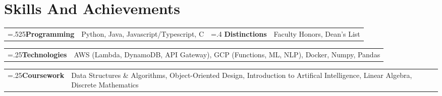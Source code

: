 \documentclass[10pt]{article}
\newcommand{\onelinecontent}[2]
    {
        \small\textbf{#1} & #2
    }
\begin{document}
                                                \section{Skills And Achievements}
                    \begin{flushleft}
                                                            \begin{tabularx}{\linewidth}{
                        >{\hsize=.525\hsize}X%
                        >{\hsize=1.475\hsize}X%
                        >{\hsize=.4\hsize}X%
                        >{\hsize=1.6\hsize}X%
                        }
                        \onelinecontent{Programming}{Python, Java, Javascript/Typescript, C}  &   \onelinecontent{Distinctions}{Faculty Honors, Dean's List} \\
                        \end{tabularx}
                                                                                \begin{tabularx}{\linewidth}{
                            >{\hsize=.25\hsize}X%
                            >{\hsize=1.75\hsize}X%
                            }
                            \onelinecontent{Technologies}{AWS (Lambda, DynamoDB, API Gateway), GCP (Functions, ML, NLP), Docker, Numpy, Pandas} \\
                        \end{tabularx}
                                                                                \begin{tabularx}{\linewidth}{
                            >{\hsize=.25\hsize}X%
                            >{\hsize=1.75\hsize}X%
                            }
                            \onelinecontent{Coursework}{Data Structures \& Algorithms, Object-Oriented Design, Introduction to Artifical Intelligence, Linear Algebra, Discrete Mathematics} \\
                        \end{tabularx}
                                    

            \end{flushleft}
            
\end{document}
